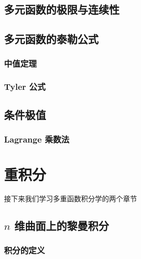 \documentclass[cn,toc=twocol]{elegantbook}
\begin{document}
\section{多元函数的极限与连续性}


\section{多元函数的泰勒公式}

\subsection{中值定理}

\subsection{Tyler 公式}

\section{条件极值}

\subsection{Lagrange 乘数法}


\chapter{重积分}
接下来我们学习多重函数积分学的两个章节

\section{$n$ 维曲面上的黎曼积分}



\subsection{积分的定义}





\end{document}
